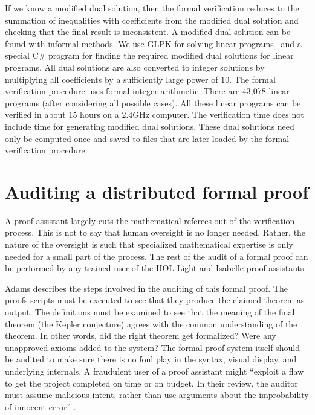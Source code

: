 If we know a modified dual solution, then the formal verification
reduces to the summation of inequalities with coefficients from the
modified dual solution and checking that the final result is
inconsistent. A modified dual solution can be found with informal
methods. We use GLPK for solving linear programs~\cite{website:GLPK}
and a special C\# program for finding the required modified dual
solutions for linear programs. All dual solutions are also converted
to integer solutions by multiplying all coefficients by a sufficiently
large power of $10$. The formal verification procedure uses formal
integer arithmetic. There are 43,078 linear programs (after
considering all possible cases). All these linear programs can be
verified in about $15$ hours on a 2.4GHz computer. The verification
time does not include time for generating modified dual
solutions. These dual solutions need only be computed once and saved
to files that are later loaded by the formal verification procedure.


\section{Auditing a distributed formal proof}

A proof assistant largely cuts the mathematical referees out of the
verification process.  This is not to say that human oversight is no
longer needed.  Rather, the nature of the oversight is such that
specialized mathematical expertise is only needed for a small
part of the process.  The rest of the audit of a formal proof can be
performed by any trained user of the HOL Light and Isabelle proof
assistants.

Adams \cite{adams2014flyspecking} describes the steps involved in the
auditing of this formal proof.  The proofs scripts must be executed to
see that they produce the claimed theorem as output.  The definitions
must be examined to see that the meaning of the final theorem (the
Kepler conjecture) agrees with the common understanding of the
theorem.  In other words, did the right theorem get formalized?  Were
any unapproved axioms added to the system?  The formal proof system
itself should be audited to make sure there is no foul play in the
syntax, visual display, and underlying internals.  A fraudulent user of
a proof assistant might ``exploit a flaw to get the project completed
on time or on budget.  In their review, the auditor must assume
malicious intent, rather than use arguments about the improbability of
innocent error'' \cite{adams2014flyspecking}.

